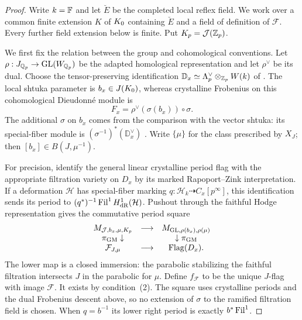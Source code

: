 \begin{proof}
Write $k=\mathbb F$ and let $\breve E$ be the completed local reflex field.
We work over a common finite extension $K$ of $K_0$ containing
$\breve E$ and a field of definition of $\mathcal F$.  Every further
field extension below is finite.  Put $K_p=\mathcal J(\mathbb Z_p)$.

We first fix the relation between the group and cohomological
conventions.  Let $\rho:J_{\mathbb Q_p}\to\operatorname{GL}(W_{\mathbb Q_p})$ be the adapted
homological representation and let $\rho^\vee$ be its dual.  Choose
the tensor-preserving identification
$\mathbb D_x\simeq\Lambda_p^\vee\otimes_{\mathbb Z_p}W(k)$ of
\cite[\S2.1.14]{KisinZhou2025}.  The local shtuka parameter is
$b_x\in J(K_0)$, whereas crystalline Frobenius on this
cohomological Dieudonn\'e module is
\[
 F_x=\rho^\vee(\sigma(b_x))\circ\sigma.
\]
The additional $\sigma$ on $b_x$ comes from the comparison with
the vector shtuka: its special-fiber module is
$(\sigma^{-1})^*(\mathbb D_x^\vee)$
\cite[Example~2.3.4 and Remark~2.3.10]{PappasRapoport2024}.
Write $\{\mu\}$ for the class prescribed by $X_J$; then
$[b_x]\in B(J,\mu^{-1})$.

For precision, identify the general linear crystalline period
flag with the appropriate filtration variety on $D_x$ by its
marked Rapoport--Zink interpretation.  If a deformation
$\mathcal H$ has special-fiber marking
$q:\mathcal H_k\dashrightarrow C_x[p^\infty]$, this identification
sends its period to
$(q^*)^{-1}\operatorname{Fil}^1H^1_{\mathrm{dR}}(\mathcal H)$.
Pushout through the faithful Hodge representation gives the
commutative period square
\[
\begin{array}{ccc}
M_{\mathcal J,b_x,\mu,K_p}&\longrightarrow&M_{\operatorname{GL},\rho(b_x),\rho(\mu)}\\
\pi_{\mathrm{GM}}\downarrow&&\downarrow\pi_{\mathrm{GM}}\\
\mathcal F_{J,\mu}&\longrightarrow&\operatorname{Flag}(D_x).
\end{array}
\]
The lower map is a closed immersion: the parabolic stabilizing
the faithful filtration intersects $J$ in the parabolic for
$\mu$.  Define $f_{\mathcal F}$ to be the unique $J$-flag with
image $\mathcal F$.  It exists by condition~\textup{(2)}.  The
square uses crystalline periods and the dual Frobenius descent
above, so no extension of $\sigma$ to the ramified filtration
field is chosen.  When $q=b^{-1}$ its lower right period is
exactly $b^*\operatorname{Fil}^1$.


\end{proof}
